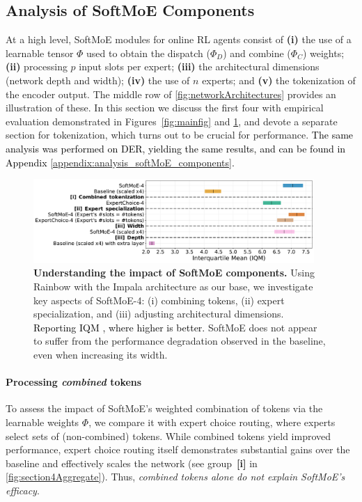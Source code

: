 \documentclass{article} %
\newcommand{\rebuttal}[1]{\textcolor{black}{#1}}
\begin{document}
\subsection{Analysis of SoftMoE Components}
\label{sec:anaysis_softmoe_components}
At a high level, SoftMoE modules for online RL agents consist of {\bf (i)} the use of a learnable tensor $\Phi$ used to obtain the dispatch ($\Phi_D$) and combine ($\Phi_C$) weights; {\bf (ii)} processing $p$ input slots per expert; {\bf (iii)} the architectural dimensions (network depth and width); {\bf (iv)} the use of $n$ experts; and {\bf (v)} the tokenization of the encoder output. The middle row of \autoref{fig:networkArchitectures} provides an illustration of these. In this section we discuss the first four with empirical evaluation demonstrated in Figures~\ref{fig:mainfig} and \ref{fig:section4Aggregate}, and devote a separate section for tokenization, which turns out to be crucial for performance. \rebuttal{The same analysis was performed on DER, yielding the same results, and can be found in Appendix \ref{appendix:analysis_softMoE_components}.}

\begin{figure}[!t]
    \centering
    \includegraphics[width=0.95\textwidth]{figures/results/section4_aggregate_v2.pdf}
    \vspace{-0.4cm}
\caption{{\bf Understanding the impact of SoftMoE components.} Using Rainbow with the Impala architecture as our base, we investigate key aspects of SoftMoE-4: (i) combining tokens, (ii) expert specialization, and (iii) adjusting architectural dimensions. \rebuttal{Reporting IQM \citep{agarwal2021deep}, where higher is better.} SoftMoE does not appear to suffer from the performance degradation observed in the baseline, even when increasing its width.
    }
    \label{fig:section4Aggregate}
    \vspace{-0.2cm}
\end{figure}

\paragraph{Processing \textit{combined} tokens} To assess the impact of SoftMoE's weighted combination of tokens via the learnable weights $\Phi$, we compare it with expert choice routing, where experts select sets of (non-combined) tokens. While combined tokens yield improved performance, expert choice routing itself demonstrates substantial gains over the baseline and effectively scales the network (see group~{\bf [i]} in \autoref{fig:section4Aggregate}). Thus, {\em combined tokens alone do not explain SoftMoE's efficacy}.
\end{document}
